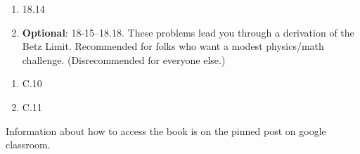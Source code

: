 \documentclass[12pt]{article}
\begin{document}
\begin{enumerate}
\setlength{\itemsep}{-1mm}
\item 18.14
\item {\bf Optional}: 18-15--18.18. These problems lead you through a
  derivation of the Betz Limit. Recommended for folks who want a
  modest physics/math challenge. (Disrecommended for everyone
  else.)
    \end{enumerate}


\begin{enumerate}
  \setlength{\itemsep}{-1mm}
\item C.10
\item C.11\\ 
\end{enumerate}

\noindent Information about how to access the book is on the
pinned post on google classroom. 
\end{document}
